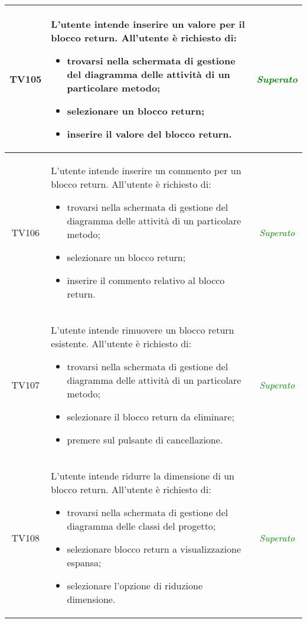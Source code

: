 \begin{longtable}{|c|>{}m{8cm}|c|}
\hypertarget{TV4.26.1}{TV105} & L'utente intende inserire un valore per il blocco return.
All'utente è richiesto di:
\begin{itemize}
	\item trovarsi nella schermata di gestione del diagramma delle attività di un particolare metodo;
	\item selezionare un blocco return;
	\item inserire il valore del blocco return.
\end{itemize} & \textcolor{Green}{\textit{Superato}}\\ \hline

\hypertarget{TV4.26.2}{TV106} & L'utente intende inserire un commento per un blocco return.
All'utente è richiesto di:
\begin{itemize}
	\item trovarsi nella schermata di gestione del diagramma delle attività di un particolare metodo;
	\item selezionare un blocco return;
	\item inserire il commento relativo al blocco return.
\end{itemize} & \textcolor{Green}{\textit{Superato}}\\ \hline

\hypertarget{TV4.27}{TV107} & L'utente intende rimuovere un blocco return esistente.
All'utente è richiesto di:
\begin{itemize}
	\item trovarsi nella schermata di gestione del diagramma delle attività di un particolare metodo;
	\item selezionare il blocco return da eliminare;
	\item premere sul pulsante di cancellazione.
\end{itemize} & \textcolor{Green}{\textit{Superato}}\\ \hline

\hypertarget{TV4.28}{TV108} & L'utente intende ridurre la dimensione di un blocco return.
All'utente è richiesto di:
\begin{itemize}
	\item trovarsi nella schermata di gestione del diagramma delle classi del progetto;
	\item selezionare blocco return a visualizzazione espansa;
	\item selezionare l'opzione di riduzione dimensione.
\end{itemize} & \textcolor{Green}{\textit{Superato}}\\ \hline


\end{longtable}
